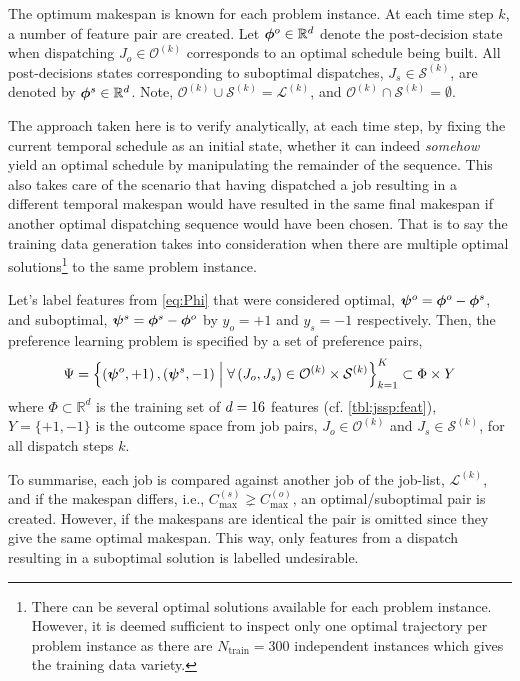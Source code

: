 \documentclass[smallextended]{svjour3}
\begin{document}
The optimum makespan is known for each problem instance. At each time step $k$, 
a number of feature pair are created. 
Let $\bm{\phi}^{o}\in{\mathbb R}^d$ denote the post-decision state when dispatching 
$J_o\in\mathcal{O}^{(k)}$ corresponds to an optimal schedule being built. 
All post-decisions states corresponding to suboptimal dispatches, 
$J_s\in\mathcal{S}^{(k)}$, are denoted by $\bm{\phi}^{s}\in{\mathbb R}^d$.
Note, \mbox{$\mathcal{O}^{(k)}\cup\mathcal{S}^{(k)}=\mathcal{L}^{(k)}$}, and 
\mbox{$\mathcal{O}^{(k)}\cap\mathcal{S}^{(k)}=\emptyset$}.

The approach taken here is to verify analytically, at each time step, by fixing 
the current temporal schedule as an initial state, whether it can indeed 
\emph{somehow} yield an optimal schedule by manipulating the remainder of the 
sequence. This also takes care of the scenario that having dispatched a job 
resulting in a different temporal makespan would have resulted in the same 
final makespan if another optimal dispatching sequence would have been chosen. 
That is to say the training data generation takes into consideration when there 
are multiple optimal solutions\footnote{
  There can be several optimal solutions available for each problem instance. 
  However, it is deemed sufficient to inspect only one optimal trajectory per 
  problem instance as there are $N_{\text{train}}=300$ independent instances 
  which gives the training data variety.} 
to the same problem instance. 

Let's label features from \cref{eq:Phi} that were considered optimal, 
\mbox{$\bm \psi^{o}=\bm{\phi}^{o}-\bm{\phi}^{s}$}, and suboptimal, 
\mbox{$\bm \psi^{s}=\bm{\phi}^{s}-\bm{\phi}^{o}$} by $y_o=+1$ and $y_s=-1$ respectively.  
Then, the preference learning problem is specified by a set of preference pairs,
\begin{equation}
\Psi = 
\left\{\left(\bm \psi^o,+1\right),\left(\bm \psi^s,-1\right)
\;\middle|\;\forall \left(J_o,J_s\right) \in \mathcal{O}^{(k)} \times 
\mathcal{S}^{(k)}\right\}_{k=1}^{K} \subset \Phi\times Y \label{eq:prefset}
\end{equation}
where $\Phi\subset \mathbb{R}^d$ is the training set of $d=16$ 
features (cf. \cref{tbl:jssp:feat}), $Y=\{+1,-1\}$ is the outcome space from 
job pairs, $J_o\in\mathcal{O}^{(k)}$ and $J_s\in\mathcal{S}^{(k)}$, for all 
dispatch steps $k$.

To summarise, each job is compared against another job of the job-list, 
$\mathcal{L}^{(k)}$, and if the makespan differs, i.e., $C_{\max}^{(s)}\gneq 
C_{\max}^{(o)}$, an optimal/suboptimal pair is created. 
However, if the makespans are identical the pair is omitted since they give the 
same optimal makespan. 
This way, only features from a dispatch resulting in a suboptimal solution is 
labelled undesirable.
\end{document}
